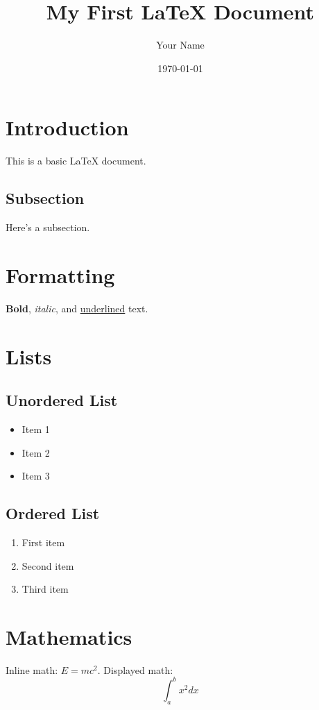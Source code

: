 \documentclass{article}
\begin{document}
\title{My First LaTeX Document}
\author{Your Name}
\date{\today}

\maketitle

\section{Introduction}
This is a basic LaTeX document.

\subsection{Subsection}
Here's a subsection.

\section{Formatting}
\textbf{Bold}, \textit{italic}, and \underline{underlined} text.

\section{Lists}
\subsection{Unordered List}
\begin{itemize}
    \item Item 1
    \item Item 2
    \item Item 3
\end{itemize}

\subsection{Ordered List}
\begin{enumerate}
    \item First item
    \item Second item
    \item Third item
\end{enumerate}

\section{Mathematics}
Inline math: $E=mc^2$. Displayed math:
\[ \int_{a}^{b} x^2 dx \]
\end{document}
